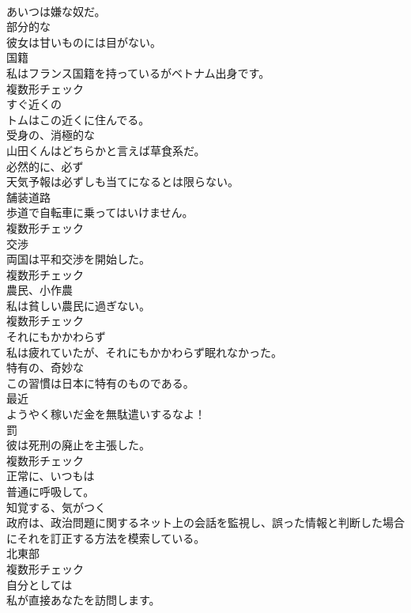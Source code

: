 \documentclass[8pt]{extreport}
\begin{document}
\begin{CJK}{UTF8}{min}
\\	あいつは嫌な奴だ。	
\\	[形容詞]	部分的な	
\\	彼女は甘いものには目がない。	
\\	[名詞]	国籍	
\\	私はフランス国籍を持っているがベトナム出身です。	
\\	複数形チェック
\\	[形容詞]	すぐ近くの	
\\	トムはこの近くに住んでる。	
\\	[形容詞]	受身の、消極的な	
\\	山田くんはどちらかと言えば草食系だ。	
\\	[副詞]	必然的に、必ず	
\\	天気予報は必ずしも当てになるとは限らない。	
\\	[名詞]	舗装道路	
\\	歩道で自転車に乗ってはいけません。	
\\	複数形チェック
\\	[名詞]	交渉	
\\	両国は平和交渉を開始した。	
\\	複数形チェック
\\	[名詞]	農⺠、小作農	
\\	私は貧しい農民に過ぎない。	
\\	複数形チェック
\\	[副詞]	それにもかかわらず	
\\	私は疲れていたが、それにもかかわらず眠れなかった。	
\\	[形容詞]	特有の、奇妙な	
\\	この習慣は日本に特有のものである。	
\\	[副詞]	最近	
\\	ようやく稼いだ金を無駄遣いするなよ！	
\\	[名詞]	罰	
\\	彼は死刑の廃止を主張した。	
\\	複数形チェック
\\	[副詞]	正常に、いつもは	
\\	普通に呼吸して。	
\\	[動詞]	知覚する、気がつく	
\\	政府は、政治問題に関するネット上の会話を監視し、誤った情報と判断した場合にそれを訂正する方法を模索している。	
\\	[名詞]	北東部	
\\	複数形チェック
\\	[副詞]	自分としては	
\\	私が直接あなたを訪問します。	

\end{CJK}
\end{document}
